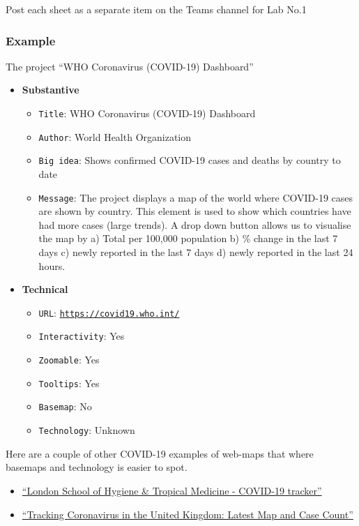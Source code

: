 \documentclass[
  letterpaper,
  DIV=11,
  numbers=noendperiod]{scrreprt}
\providecommand{\tightlist}{%
  \setlength{\itemsep}{0pt}\setlength{\parskip}{0pt}}\usepackage{longtable,booktabs,array}
\begin{document}
Post each sheet as a separate item on the Teams channel for Lab No.1

\subsubsection{Example}\label{example}

The project ``WHO Coronavirus (COVID-19) Dashboard''

\begin{itemize}
\item
  \textbf{Substantive}

  \begin{itemize}
  \tightlist
  \item
    \texttt{Title}: WHO Coronavirus (COVID-19) Dashboard
  \item
    \texttt{Author}: World Health Organization
  \item
    \texttt{Big\ idea}: Shows confirmed COVID-19 cases and deaths by
    country to date
  \item
    \texttt{Message}: The project displays a map of the world where
    COVID-19 cases are shown by country. This element is used to show
    which countries have had more cases (large trends). A drop down
    button allows us to visualise the map by a) Total per 100,000
    population b) \% change in the last 7 days c) newly reported in the
    last 7 days d) newly reported in the last 24 hours.
  \end{itemize}
\item
  \textbf{Technical}

  \begin{itemize}
  \tightlist
  \item
    \texttt{URL}:
    \href{https://covid19.who.int/}{\texttt{https://covid19.who.int/}}
  \item
    \texttt{Interactivity}: Yes
  \item
    \texttt{Zoomable}: Yes
  \item
    \texttt{Tooltips}: Yes
  \item
    \texttt{Basemap}: No
  \item
    \texttt{Technology}: Unknown
  \end{itemize}
\end{itemize}

Here are a couple of other COVID-19 examples of web-maps that where
basemaps and technology is easier to spot.

\begin{itemize}
\tightlist
\item
  \href{https://vac-lshtm.shinyapps.io/ncov_tracker/?_ga=2.246644480.501918083.1674819300-1251881958.1674819300}{``London
  School of Hygiene \& Tropical Medicine - COVID-19 tracker''}
\item
  \href{https://www.nytimes.com/interactive/2021/world/united-kingdom-covid-cases.html}{``Tracking
  Coronavirus in the United Kingdom: Latest Map and Case Count''}
\end{itemize}
\end{document}
